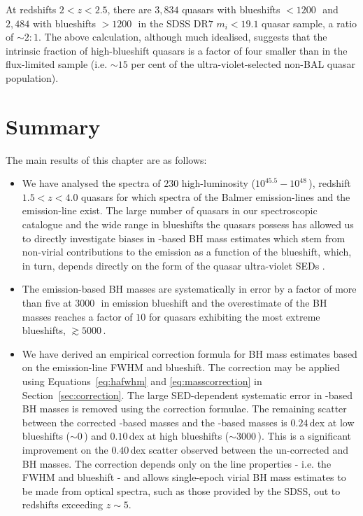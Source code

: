At redshifts $2 < z <2.5$, there are $3,834$ quasars with  blueshifts $<1200$\,\kms\, and $2,484$ with blueshifts $>1200$\,\kms\, in the SDSS DR$7$ $m_i < 19.1$ quasar sample, a ratio of $\sim2:1$. 
The above calculation, although much idealised, suggests that the intrinsic fraction of high-blueshift quasars is a factor of four smaller than in the flux-limited sample (i.e. $\sim15$ per cent of the ultra-violet-selected non-BAL quasar population). 

\section{Summary}
\label{sec:conclusions}

The main results of this chapter are as follows: 

\begin{itemize}

\item We have analysed the spectra of $230$ high-luminosity ($10^{45.5}-10^{48}$\,\ergs), redshift $1.5 < z < 4.0$ quasars for which spectra of the Balmer emission-lines and the  emission-line exist.
The large number of quasars in our spectroscopic catalogue and the wide range in  blueshifts the quasars possess has allowed us to directly investigate biases in -based BH mass estimates which stem from non-virial contributions to the  emission as a function of the  blueshift, which, in turn, depends directly on the form of the quasar ultra-violet SEDs \citep{richards11}.

\item The  emission-based BH masses are systematically in error by a factor of more than five at $3000$\,\kms\, in  emission blueshift and the overestimate of the BH masses reaches a factor of $10$ for quasars exhibiting the most extreme blueshifts, $\gtrsim5000$\,\kms. 

\item We have derived an empirical correction formula for BH mass estimates based on the  emission-line FWHM and blueshift.
The correction may be applied using Equations~\ref{eq:hafwhm} and \ref{eq:masscorrection} in Section~\ref{sec:correction}.
The large SED-dependent systematic error in -based BH masses is removed using the correction formulae.
The remaining scatter between the corrected -based masses and the \hans-based masses is $0.24$\,dex at low  blueshifts ($\sim0$\,\kms) and $0.10$\,dex at high blueshifts ($\sim3000$\,\kms). 
This is a significant improvement on the $0.40$\,dex scatter observed between the un-corrected  and \ha BH masses. 
The correction depends only on the  line properties - i.e. the FWHM and blueshift - and allows single-epoch virial BH mass estimates to be made from optical spectra, such as those provided by the SDSS, out to redshifts exceeding $z\sim 5$. 

\end{itemize}

